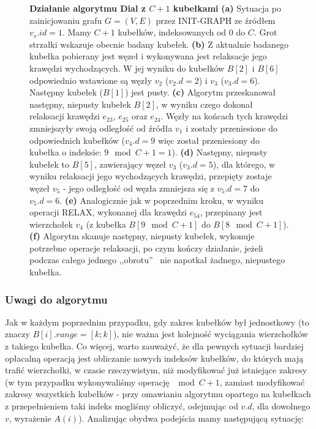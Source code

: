 \begin{figure}[!htbp]
\begin{subfigure}[b]{0.3\textwidth}
		\caption{}
	\end{subfigure}
	\caption{\textbf{Działanie algorytmu Dial z $C+1$ kubełkami} \textbf{(a)} Sytuacja po zainicjowaniu grafu $G = \left( V, E \right)$ przez \textsf{INIT-GRAPH} ze źródłem $v_{s}.id = 1$. Mamy $C+1$ kubełków, indeksowanych od $0$ do $C$. Grot strzałki wskazuje obecnie badany kubełek. \textbf{(b)} Z aktualnie badanego kubełka pobierany jest węzeł i wykonywana jest relaksacje jego krawędzi wychodzących. W jej wyniku do kubełków $B \left[ 2 \right]$ i $B \left[ 6 \right]$ odpowiednio wstawione są węzły $v_{2}$ ($v_{2}.d = 2$) i $v_{3}$ ($v_{3}.d = 6$). Następny kubełek ($B \left[ 1\right]$) jest pusty. \textbf{(c)} Algorytm przeskanował następny, niepusty kubełek $B \left[ 2 \right]$, w wyniku czego dokonał relaksacji krawędzi $e_{23}$, $e_{25}$ oraz $e_{24}$. Węzły na końcach tych krawędzi zmniejszyły swoją odległość od źródła $v_{1}$ i zostały przeniesione do odpowiednich kubełków ($v_{4}.d = 9$ więc został przeniesiony do kubełka o indeksie: $9 \mod{C+1} = 1$). \textbf{(d)} Następny, niepusty kubełek to $B \left[ 5 \right]$, zawierający węzeł $v_{3}$ ($v_{3}.d = 5$), dla którego, w wyniku relaksacji jego wychodzących krawędzi, przepięty zostaje węzeł $v_{5}$ - jego odległość od węzła zmniejsza się z $v_{5}.d = 7$ do $v_{5}.d = 6$. \textbf{(e)} Analogicznie jak w poprzednim kroku, w wyniku operacji \textsc{RELAX}, wykonanej dla krawędzi $e_{54}$, przepinany jest wierzchołek $v_{4}$ (z kubełka $B \left[ 9 \mod{C+1} \right]$ do $B \left[ 8 \mod{C+1} \right]$). \textbf{(f)} Algorytm skanuje następny, niepusty kubełek, wykonuje potrzebne operacje relaksacji, po czym kończy działanie, jeżeli podczas całego jednego ,,obrotu''~ nie napotkał żadnego, niepustego kubełka. } \label{fig:exampleDial}
\end{figure}

\subsubsection{Uwagi do algorytmu}

Jak w każdym poprzednim przypadku, gdy zakres kubełków był jednostkowy (to znaczy $B \left[ i \right].range = \left[ k ; k \right]$), nie ważna jest kolejność wyciągania wierzchołków z takiego kubełka. Co więcej, warto zauważyć, że dla pewnych sytuacji bardziej opłacalną operacją jest obliczanie nowych indeksów kubełków, do których mają trafić wierzchołki, w czasie rzeczywistym, niż modyfikować już istniejące zakresy (w tym przypadku wykonywaliśmy operację $\mod{C+1}$, zamiast modyfikować zakresy wszystkich kubełków - przy omawianiu algorytmu opartego na kubełkach z przepełnieniem taki indeks mogliśmy obliczyć, odejmując od $v.d$, dla dowolnego $v$, wyrażenie $A \left( i \right)$). Analizując obydwa podejścia mamy następującą sytuację:

